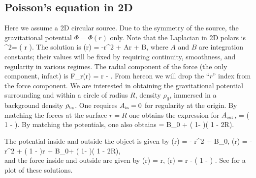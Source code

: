 \documentclass[a4paper, 12pt]{article}
\numberwithin{equation}{section}
\begin{document}
\subsection{Poisson's equation in 2D}
Here we assume a 2D  circular source. Due to the symmetry of the source, the gravitational potential $\Phi = \Phi(r)$ only. Note that the Laplacian in 2D polars is
\bea
\nabla^2\Phi = \left( r \right).
\eea
The solution is
\bea
\Phi(r) = -r^2 + A\ln r + B,
\eea
where $A$ and $B$ are integration constants; their values will be fixed by requiring continuity, smoothness, and regularity in various regimes. The radial component of the force (the only component, infact) is
\bea
F_r(r) =  r - .
\eea
From hereon we will drop the ``$r$'' index from the force component.
We are interested in obtaining the gravitational potential surrounding and within a circle of radius $R$, density $\rho_0$, immersed in a background density ${\rho}_{\scriptscriptstyle{\textrm{bg}}}$. One requires ${A}_{\scriptscriptstyle{\textrm{in}}}=0$ for regularity at the origin. By matching the forces at the surface $r=R$ one obtains the   expression for ${A}_{\scriptscriptstyle{\textrm{out}}}$,
\bse
\bea
{} = \left( 1 - \right).
\eea
By matching the potentials, one also obtains
\bea
{} = B_0 + \left( 1- \right)\left( 1 - 2\ln R\right).
\eea
\ese


The potential inside and outside the object is given by
\bse
\label{poiss-soln-1}
\bea
{}(r) = - r^2 + B_0,
\eea
\bea
{}(r) = - r^2 +  \left( 1 - \right)\ln r + B_0+ \left( 1- \right)\left( 1 - 2\ln R\right),\nonumber\\
\eea
\ese
and the force inside and outside are given by
\bse
\label{poiss-soln-2}
\bea
{}(r) = r,
\eea
\bea
{}(r) =  r -   \left( 1 - \right)  .
\eea
\ese
See  for a plot of these solutions.
\end{document}
